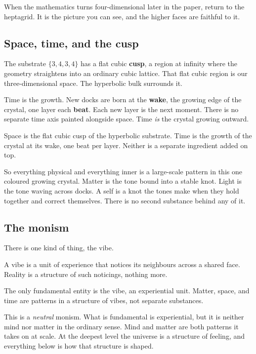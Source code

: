 When the mathematics turns four-dimensional later in the paper, return to the heptagrid. It is the picture you can see, and the higher faces are faithful to it.

\subsection{Space, time, and the cusp}

The substrate $\{3,4,3,4\}$ has a flat cubic \textbf{cusp}, a region at infinity where the geometry straightens into an ordinary cubic lattice. That flat cubic region is our three-dimensional space. The hyperbolic bulk surrounds it.

Time is the growth. New docks are born at the \textbf{wake}, the growing edge of the crystal, one layer each \textbf{beat}. Each new layer is the next moment. There is no separate time axis painted alongside space. Time \emph{is} the crystal growing outward.

\begin{principle}
Space is the flat cubic cusp of the hyperbolic substrate. Time is the growth of the crystal at its wake, one beat per layer. Neither is a separate ingredient added on top.
\end{principle}

So everything physical and everything inner is a large-scale pattern in this one coloured growing crystal. Matter is the tone bound into a stable knot. Light is the tone waving across docks. A self is a knot the tones make when they hold together and correct themselves. There is no second substance behind any of it.

\subsection{The monism}

There is one kind of thing, the vibe.

A vibe is a unit of experience that notices its neighbours across a shared face. Reality is a structure of such noticings, nothing more.

\begin{axiom}
The only fundamental entity is the vibe, an experiential unit. Matter, space, and time are patterns in a structure of vibes, not separate substances.
\end{axiom}

This is a \emph{neutral} monism. What is fundamental is experiential, but it is neither mind nor matter in the ordinary sense. Mind and matter are both patterns it takes on at scale. At the deepest level the universe is a structure of feeling, and everything below is how that structure is shaped.

